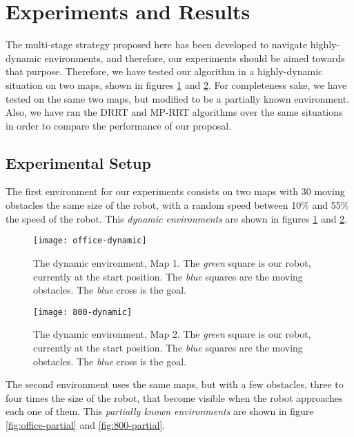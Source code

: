 \documentclass[10pt, conference, compsoc]{IEEEtran}
\begin{document}
\section{Experiments and Results}\label{sec:results}

The multi-stage strategy proposed here has been developed
to navigate highly-dynamic environments, and therefore,
our experiments should be aimed towards that purpose.
Therefore, we have tested our algorithm in a highly-dynamic 
situation on two maps, shown in figures \ref{fig:office-dynamic} and
\ref{fig:800-dynamic}. For completeness sake, we have tested on the same two
maps, but modified to be a partially known
environment.
Also, we have ran the DRRT and MP-RRT algorithms over the same 
situations in order to compare the performance of our proposal.

\subsection{Experimental Setup}

The first environment for our experiments consists on two maps with 30 moving
obstacles the same size of the robot, with a random speed between 10\% and 55\%
the speed of the robot. This \emph{dynamic environments} are shown in figures
\ref{fig:office-dynamic} and \ref{fig:800-dynamic}.\\

\begin{figure}[ht]
\begin{center}
\texttt{[image: office-dynamic]}
\caption{The dynamic environment, Map 1. The \emph{green} square is our robot,
currently at the start position. The
\emph{blue} squares are the moving obstacles. The \emph{blue} cross is the goal.}
\label{fig:office-dynamic}
\end{center}
\end{figure}

\begin{figure}[ht]
\begin{center}
\texttt{[image: 800-dynamic]}
\caption{The dynamic environment, Map 2. The \emph{green} square is our robot,
currently at the start position. The
\emph{blue} squares are the moving obstacles. The \emph{blue} cross is the goal.}
\label{fig:800-dynamic}
\end{center}
\end{figure}

The second environment uses the same maps, but with a few  obstacles, three to four
times the size of the robot, that become visible when the robot approaches each one of them. This
\emph{partially known environments} are shown in figure \ref{fig:office-partial}
and \ref{fig:800-partial}.\\
\end{document}
